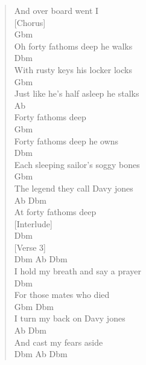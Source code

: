 \documentclass[11pt]{article}
\begin{document}
\begin{verse}
And over board went I\\
\vspace*{1em}
\vspace*{1em}
[Chorus]\\
\hspace*{3em}Gbm\\
Oh forty fathoms deep he walks\\
\hspace*{5em}Dbm\\
With rusty keys his locker locks\\
\hspace*{5em}Gbm\\
Just like he's half asleep he stalks\\
Ab\\
Forty fathoms deep\\
Gbm\\
Forty fathoms deep he owns\\
\hspace*{5em}Dbm\\
Each sleeping sailor's soggy bones\\
\hspace*{4em}Gbm\\
The legend they call Davy jones\\
\hspace*{3em}Ab            Dbm\\
At forty fathoms deep\\
\vspace*{1em}
\vspace*{1em}
[Interlude]\\
Dbm\\
\vspace*{1em}
\vspace*{1em}
[Verse 3]\\
\hspace*{2em}Dbm     Ab         Dbm\\
I hold my breath and say a prayer\\
Dbm\\
For those mates who died\\
\hspace*{2em}Gbm             Dbm\\
I turn my back on Davy jones\\
\hspace*{4em}Ab             Dbm\\
And cast my fears aside\\
\hspace*{6em}Dbm   Ab       Dbm\\

\end{verse}
\end{document}
